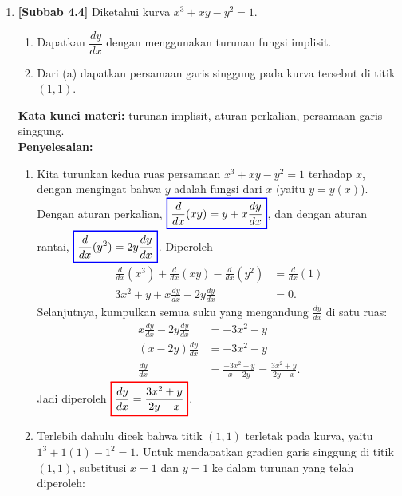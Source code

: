 \documentclass[10pt,openany,a4paper]{article}
\theoremstyle{definition}
\theoremstyle{definition}
\theoremstyle{plain}
\newenvironment{jawab}[2][tes]{%
\par\noindent\textbf{Kata kunci materi:} #1.\\
\textbf{Penyelesaian:} #2%
}{}
\begin{document}
\begin{enumerate}
    \item \textbf{[Subbab 4.4]} Diketahui kurva $x^3+xy-y^2=1$.
    \begin{enumerate}
        \item Dapatkan $\dfrac{dy}{dx}$ dengan menggunakan turunan fungsi implisit.
        \item Dari (a) dapatkan persamaan garis singgung pada kurva tersebut di titik $(1,1)$.
    \end{enumerate}
    \begin{jawab}[turunan implisit, aturan perkalian, persamaan garis singgung]{
        \begin{enumerate}
            \item Kita turunkan kedua ruas persamaan $x^3+xy-y^2=1$ terhadap $x$, dengan mengingat bahwa $y$ adalah fungsi dari $x$ (yaitu $y=y(x)$). Dengan aturan perkalian, $\colorlet{oldcolor}{.}
        \color{blue}
        \setlength{\fboxrule}{1pt} \boxed{\color{oldcolor}\frac{d}{dx}(xy) = y + x\frac{dy}{dx}}\color{oldcolor}$, dan dengan aturan rantai, $\colorlet{oldcolor}{.}
        \color{blue}
        \setlength{\fboxrule}{1pt} \boxed{\color{oldcolor}\frac{d}{dx}(y^2) = 2y\frac{dy}{dx}}\color{oldcolor}$. Diperoleh
            \begin{align*}
                \frac{d}{dx}(x^3) + \frac{d}{dx}(xy) - \frac{d}{dx}(y^2) &= \frac{d}{dx}(1)\\
                3x^2 + y + x\frac{dy}{dx} - 2y\frac{dy}{dx} &= 0.
            \end{align*}
            Selanjutnya, kumpulkan semua suku yang mengandung $\frac{dy}{dx}$ di satu ruas:
            \begin{align*}
                x\frac{dy}{dx} - 2y\frac{dy}{dx} &= -3x^2 - y\\
                (x - 2y)\frac{dy}{dx} &= -3x^2 - y\\
                \frac{dy}{dx} &= \frac{-3x^2 - y}{x - 2y} = \frac{3x^2+y}{2y-x}.
            \end{align*}
            Jadi diperoleh $\colorlet{oldcolor}{.}
        \color{red}
        \setlength{\fboxrule}{1pt} \boxed{\color{oldcolor}\frac{dy}{dx} = \frac{3x^2 + y}{2y - x}}\color{oldcolor}$.
            \item Terlebih dahulu dicek bahwa titik $(1,1)$ terletak pada kurva, yaitu $1^3+1(1)-1^2=1$. Untuk mendapatkan gradien garis singgung di titik $(1,1)$, substitusi $x=1$ dan $y=1$ ke dalam turunan yang telah diperoleh:
            \begin{align*}

\end{align*}
\end{enumerate}}
\end{jawab}
\end{enumerate}
\end{document}
